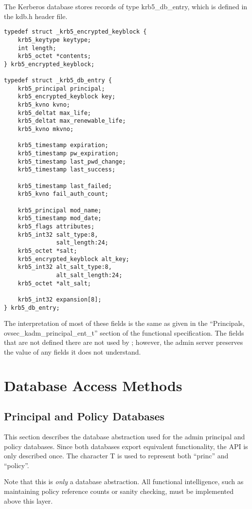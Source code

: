 The Kerberos database stores records of type krb5_db_entry, which is
defined in the kdb.h header file.

\begin{verbatim}
typedef struct _krb5_encrypted_keyblock {
    krb5_keytype keytype;
    int length;
    krb5_octet *contents;
} krb5_encrypted_keyblock;

typedef struct _krb5_db_entry {
    krb5_principal principal;
    krb5_encrypted_keyblock key;
    krb5_kvno kvno;
    krb5_deltat max_life;
    krb5_deltat max_renewable_life;
    krb5_kvno mkvno;
    
    krb5_timestamp expiration;
    krb5_timestamp pw_expiration;
    krb5_timestamp last_pwd_change;
    krb5_timestamp last_success;   
    
    krb5_timestamp last_failed;
    krb5_kvno fail_auth_count;
    
    krb5_principal mod_name;
    krb5_timestamp mod_date;
    krb5_flags attributes;
    krb5_int32 salt_type:8,
               salt_length:24;
    krb5_octet *salt;
    krb5_encrypted_keyblock alt_key;
    krb5_int32 alt_salt_type:8,
               alt_salt_length:24;
    krb5_octet *alt_salt;
    
    krb5_int32 expansion[8];
} krb5_db_entry;
\end{verbatim}

The interpretation of most of these fields is the same as given in the
``Principals, ovsec_kadm_principal_ent_t'' section of the functional
specification.  The fields that are not defined there are not used by
\secure{}; however, the admin server preserves the value of any fields
it does not understand.

\section{Database Access Methods}

\subsection{Principal and Policy Databases}

This section describes the database abstraction used for the admin
principal and policy databases.  Since both databases export
equivalent functionality, the API is only described once.  The
character T is used to represent both ``princ'' and ``policy''.

Note that this is {\it only} a database abstraction.  All functional
intelligence, such as maintaining policy reference counts or sanity
checking, must be implemented above this layer.


